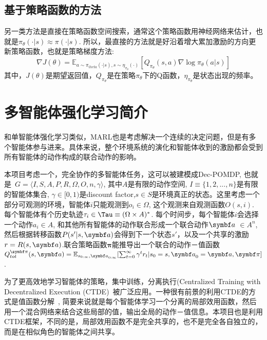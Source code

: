 \subsection{基于策略函数的方法}
另一类方法是直接在策略函数空间搜索，通常这个策略函数用神经网络来估计，也就是$\pi_\theta(\cdot|s)\approx \pi(\cdot|s)$. 所以，最直接的方法就是好沿着增大累加激励的方向更新策略函数，也就是策略梯度方法:
\begin{equation}
    \nabla J(\theta) = \mathbb{E}_{a\sim \pi_{theta}(\cdot|s),s\sim\eta_{\pi_\theta}(\cdot)}\left[Q_{\pi_\theta}(s,a)\nabla \log \pi_\theta (a|s) \right]
\end{equation}
其中，$J(\theta)$是期望返回值，$Q_{\pi_\theta}$是在策略$\pi_\theta$下的Q函数，$\eta_{\pi_\theta}$是状态出现的频率。

\section{多智能体强化学习简介}
和单智能体强化学习类似，MARL也是考虑解决一个连续的决定问题，但是有多个智能体参与进来。具体来说，整个环境系统的演化和智能体收到的激励都会受到所有智能体的动作构成的联合动作的影响。

本项目考虑一个，完全协作的多智能体任务，这可以被建模成Dec-POMDP, 也就是~\cite{oliehoek2016concise}$G=\langle I, S, A, P, R, \Omega, O, n, \gamma\rangle$, 其中$A$是有限的动作空间, $I\equiv\{1,2,...,n\}$是有限的智能体集合, $\gamma\in[0, 1)$是discount factor,$s\in S$是环境真正的状态。这里考虑一个部分可观测的环境，智能体$i$只能观测到$o_i\in \Omega$, 这个观测来自观测函数$O(s, i)$. 每个智能体有个历史轨迹$\tau_i\in \Tau\equiv(\Omega\times A)^*$. 每个时间步，每个智能体$i$会选择一个动作$a_i\in A$, 和其他所有智能体的动作联合形成一个联合动作$\va$ $\in A^n$,然后根据转移函数$P(s'|s, \va)$会得到下一个状态$s'$，以及一个共享的激励$r=R(s,\va)$.联合策略函数$\bm{\pi}$能推导出一个联合的动作－值函数$Q_{tot}^{\bm{\pi}}(s,\va)=\mathbb{E}_{s_{0:\infty},\va_{0:\infty}}[\sum_{t=0}^\infty \gamma^{t}r_t|s_0=s,\va_0=\va,\bm{\pi}]$. 

为了更高效地学习智能体的策略，集中训练，分离执行(Centralized Training with Decentralized Execution (CTDE)~\cite{foerster2016learning, foerster2018counterfactual}被广泛应用。一种很有前景的利用CTDE的方式是值函数分解~\cite{sunehag2018value, rashid2018qmix, son2019qtran}, 简要来说就是每个智能体学习一个分离的局部效用函数，然后用一个混合网络来结合这些局部的值，输出全局的动作－值信息。本项目也是利用CTDE框架，不同的是，局部效用函数不是完全共享的，也不是完全各自独立的，而是在相似角色的智能体之间共享。

